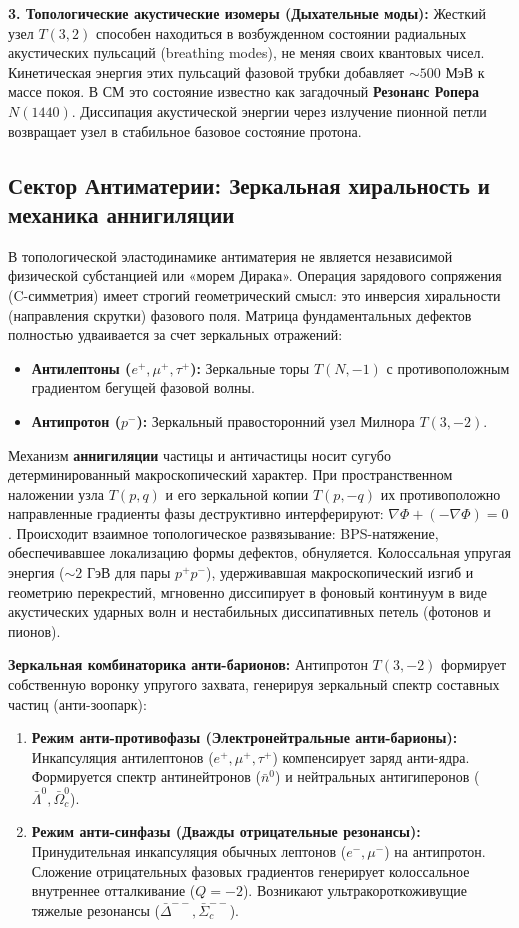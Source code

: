 \documentclass[11pt,a4paper]{article}
\begin{document}
\textbf{3. Топологические акустические изомеры (Дыхательные моды):}
Жесткий узел $T(3,2)$ способен находиться в возбужденном состоянии радиальных акустических пульсаций (breathing modes), не меняя своих квантовых чисел. Кинетическая энергия этих пульсаций фазовой трубки добавляет $\sim 500$ МэВ к массе покоя. В СМ это состояние известно как загадочный \textbf{Резонанс Ропера $N(1440)$}. Диссипация акустической энергии через излучение пионной петли возвращает узел в стабильное базовое состояние протона.

\subsection{Сектор Антиматерии: Зеркальная хиральность и механика аннигиляции}
В топологической эластодинамике антиматерия не является независимой физической субстанцией или «морем Дирака». Операция зарядового сопряжения (C-симметрия) имеет строгий геометрический смысл: это инверсия хиральности (направления скрутки) фазового поля. Матрица фундаментальных дефектов полностью удваивается за счет зеркальных отражений:
\begin{itemize}
    \item \textbf{Антилептоны ($e^+, \mu^+, \tau^+$):} Зеркальные торы $T(N, -1)$ с противоположным градиентом бегущей фазовой волны.
    \item \textbf{Антипротон ($p^-$):} Зеркальный правосторонний узел Милнора $T(3, -2)$.
\end{itemize}

Механизм \textbf{аннигиляции} частицы и античастицы носит сугубо детерминированный макроскопический характер. При пространственном наложении узла $T(p,q)$ и его зеркальной копии $T(p,-q)$ их противоположно направленные градиенты фазы деструктивно интерферируют: $\nabla \Phi + (-\nabla \Phi) = 0$. Происходит взаимное топологическое развязывание: BPS-натяжение, обеспечивавшее локализацию формы дефектов, обнуляется. Колоссальная упругая энергия ($\sim 2$ ГэВ для пары $p^+p^-$), удерживавшая макроскопический изгиб и геометрию перекрестий, мгновенно диссипирует в фоновый континуум в виде акустических ударных волн и нестабильных диссипативных петель (фотонов и пионов). 

\textbf{Зеркальная комбинаторика анти-барионов:}
Антипротон $T(3,-2)$ формирует собственную воронку упругого захвата, генерируя зеркальный спектр составных частиц (анти-зоопарк):
\begin{enumerate}
    \item \textbf{Режим анти-противофазы (Электронейтральные анти-барионы):} Инкапсуляция антилептонов ($e^+, \mu^+, \tau^+$) компенсирует заряд анти-ядра. Формируется спектр антинейтронов ($\bar{n}^0$) и нейтральных антигиперонов ($\bar{\Lambda}^0, \bar{\Omega}_c^0$).
    \item \textbf{Режим анти-синфазы (Дважды отрицательные резонансы):} Принудительная инкапсуляция обычных лептонов ($e^-, \mu^-$) на антипротон. Сложение отрицательных фазовых градиентов генерирует колоссальное внутреннее отталкивание ($Q=-2$). Возникают ультракороткоживущие тяжелые резонансы ($\bar{\Delta}^{--}, \bar{\Sigma}_c^{--}$).
\end{enumerate}
\end{document}
